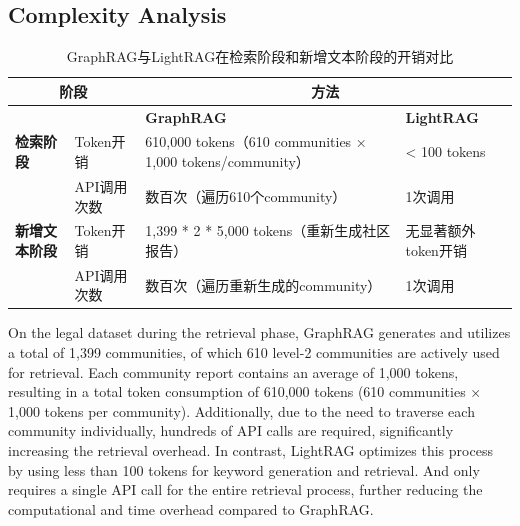 \documentclass{article} %
\begin{document}
\subsection{Complexity Analysis}

\begin{table}[h]
\centering
\begin{tabular}{|l|l|l|l|}
\hline
\multicolumn{2}{|c|}{\textbf{阶段}}          & \multicolumn{2}{c|}{\textbf{方法}}                     \\ \hline
\textbf{}          & \textbf{} & \textbf{GraphRAG}                                      & \textbf{LightRAG}                              \\ \hline
\textbf{检索阶段}   & Token开销  & 610,000 tokens（610 communities × 1,000 tokens/community） & < 100 tokens                                   \\ \hline
                    & API调用次数 & 数百次（遍历610个community）                              & 1次调用                                       \\ \hline
\textbf{新增文本阶段} & Token开销  & 1,399 * 2 * 5,000 tokens（重新生成社区报告）                & 无显著额外token开销                           \\ \hline
                    & API调用次数 & 数百次（遍历重新生成的community）                          & 1次调用                                       \\ \hline
\end{tabular}
\caption{GraphRAG与LightRAG在检索阶段和新增文本阶段的开销对比}
\end{table}


On the legal dataset during the retrieval phase, GraphRAG generates and utilizes a total of 1,399 communities, of which 610 level-2 communities are actively used for retrieval. Each community report contains an average of 1,000 tokens, resulting in a total token consumption of 610,000 tokens (610 communities × 1,000 tokens per community). Additionally, due to the need to traverse each community individually, hundreds of API calls are required, significantly increasing the retrieval overhead. In contrast, LightRAG optimizes this process by using less than 100 tokens for keyword generation and retrieval. And only requires a single API call for the entire retrieval process, further reducing the computational and time overhead compared to GraphRAG.
\end{document}
